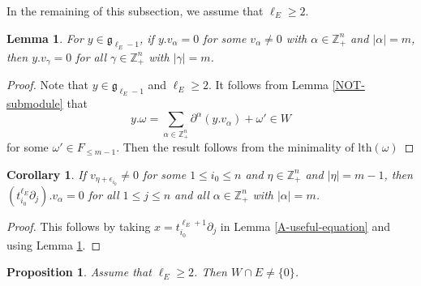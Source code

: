 \documentclass[12pt, a4paper]{amsart}
\newcommand{\Z}{\mathbb Z}
\theoremstyle{Theorem}
\theoremstyle{Theorem}
\newtheorem{corollary}[thm]{Corollary}
\newtheorem{lemma}[thm]{Lemma}
\newtheorem{proposition}[thm]{Proposition}
\numberwithin{equation}{section}
\begin{document}
In the remaining of this subsection, we assume that $\ell_E\geq2$.
\begin{lemma}\label{minimality-lht-vector}
For $y\in\mathfrak{g}_{\ell_E-1}$, if $y.v_{\alpha}=0$ for some $v_{\alpha}\neq0$
with $\alpha\in\Z_{+}^{n}$ and $|\alpha|=m$, then $y.v_{\gamma}=0$ for all $\gamma\in\mathbb{Z}_+^n$ with $|\gamma|=m$.
\end{lemma}

\begin{proof}
Note that $y\in\mathfrak{g}_{\ell_E-1}$ and $\ell_{E}\geq2$. It follows from Lemma \ref{NOT-submodule} that
\[y.\omega=\sum_{\alpha\in\mathbb{Z}_+^n}\partial^{\alpha}(y.v_{\alpha})+\omega'\in W\]
for some $\omega'\in F_{\leq m-1}$. Then the result follows from the minimality of $\text{lth}(\omega)$
\end{proof}



\begin{corollary}\label{A-useful-corollary}
If $v_{\eta+\epsilon_{i_0}}\neq0$ for some $1\leq i_{0}\leq n$ and $\eta\in\mathbb{Z}_+^n$ and $|\eta|=m-1$, then $(t_{i_0}^{\ell_E}\partial_j).v_{\alpha}=0$ for all $1\leq j\leq n$ and all $\alpha\in\mathbb{Z}_+^n$ with $|\alpha|=m$.
\end{corollary}

\begin{proof}
This follows by taking $x=t_{i_0}^{\ell_E+1}\partial_j$ in Lemma \ref{A-useful-equation}
and using Lemma \ref{minimality-lht-vector}.
\end{proof}

\begin{proposition}\label{Important-Prop}
Assume that $\ell_E\geq2$. Then $W\cap E\neq\{0\}$.
\end{proposition}
\end{document}
